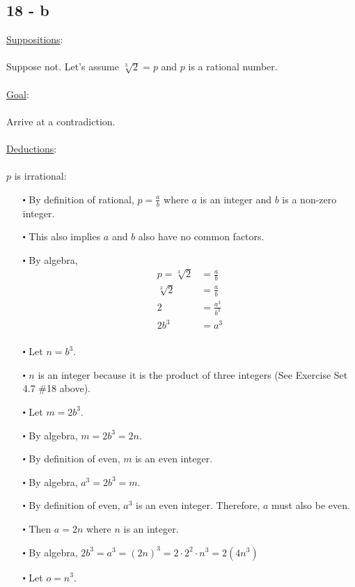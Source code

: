 \documentclass[12pt]{article}
\begin{document}
\subsection*{18 - b}
\underline{Suppositions}:
\\ \\
Suppose not. Let's assume $\sqrt[3]{2} = p$ and $p$ is a rational number.
\\ \\ 
\underline{Goal}:
\\ \\
Arrive at a contradiction.
\\ \\
\underline{Deductions}:
\\ \\
$p$ is irrational:
\begin{itemize}
  \item [$\centerdot$] By definition of rational, $p = \frac{a}{b}$ where $a$ is an integer and $b$ is a non-zero integer.
  \item [$\centerdot$] This also implies $a$ and $b$ also have no common factors.
  \item [$\centerdot$] By algebra,
  \begin{align*}
    p =\sqrt[3]{2} &=\frac{a}{b} \\
    \sqrt[3]{2} &= \frac{a}{b} \\
    2 &= \frac{a^3}{b^3} \\
    2b^3 &= a^3\\
  \end{align*}
  \item [$\centerdot$] Let $n = b^3$. 
  \item [$\centerdot$] $n$ is an integer because it is the product of three integers (See Exercise Set 4.7 \#18  above).
  \item [$\centerdot$] Let $m = 2b^3$.
  \item [$\centerdot$] By algebra, $m = 2b^3 = 2n$.
  \item [$\centerdot$] By definition of even, $m$ is an even integer.
  \item [$\centerdot$] By algebra, $a^3 = 2b^3 = m$.
  \item [$\centerdot$] By definition of even, $a^3$ is an even integer. Therefore, $a$ must also be even.
  \item [$\centerdot$] Then $a = 2n$ where $n$ is an integer.
  \item [$\centerdot$] By algebra, $2b^3 = a^3 = (2n)^3 = 2\cdot2^2\cdot n^3 = 2(4n^3)$ 
  \item [$\centerdot$] Let $o = n^3$.

\end{itemize}
\end{document}
